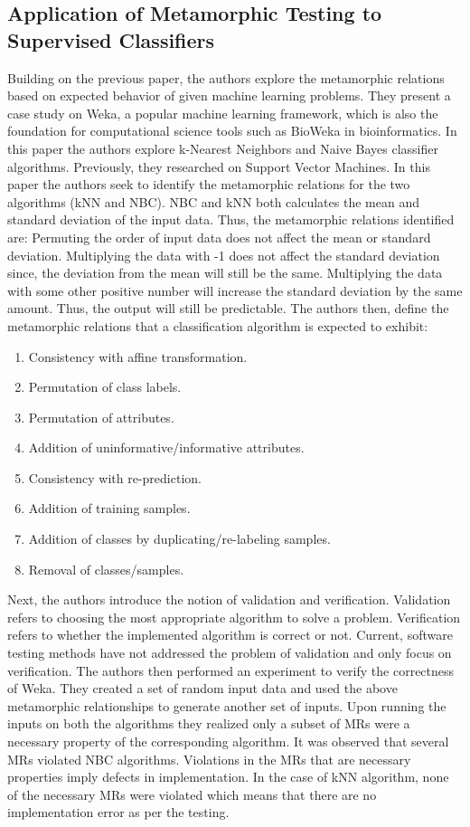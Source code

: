 \subsection{Application of Metamorphic Testing to Supervised Classifiers \cite{Xie2009}}
Building on the previous paper, the authors explore the metamorphic relations based on expected behavior of given machine learning problems. They present a case study on Weka, a popular machine learning framework, which is also the foundation for computational science tools such as BioWeka in bioinformatics. In this paper the authors explore k-Nearest Neighbors and Naive Bayes classifier algorithms. Previously, they researched on Support Vector Machines.
In this paper the authors seek to identify the metamorphic relations for the two algorithms (kNN and NBC). NBC and kNN both calculates the mean and standard deviation of the input data. Thus, the metamorphic relations identified are:
Permuting the order of input data does not affect the mean or standard deviation.
Multiplying the data with -1 does not affect the standard deviation since, the deviation from the mean will still be the same.
Multiplying the data with some other positive number will increase the standard deviation by the same amount. Thus, the output will still be predictable.
The authors then, define the metamorphic relations that a classification algorithm is expected to exhibit:
\begin{enumerate}
  \item Consistency with affine transformation.
  \item Permutation of class labels.
  \item Permutation of attributes.
  \item Addition of uninformative/informative attributes.
  \item Consistency with re-prediction.
  \item Addition of training samples.
  \item Addition of classes by duplicating/re-labeling samples.
  \item Removal of classes/samples.
\end{enumerate}
Next, the authors introduce the notion of validation and verification. Validation refers to choosing the most appropriate algorithm to solve a problem. Verification refers to whether the implemented algorithm is correct or not. Current, software testing methods have not addressed the problem of validation and only focus on verification.
The authors then performed an experiment to verify the correctness of Weka. They created a set of random input data and used the above metamorphic relationships to generate another set of inputs. Upon running the inputs on both the algorithms they realized only a subset of MRs were a necessary property of the corresponding algorithm. It was observed that several MRs violated NBC algorithms. Violations in the MRs that are necessary properties imply defects in implementation. In the case of kNN algorithm, none of the necessary MRs were violated which means that there are no implementation error as per the testing.

